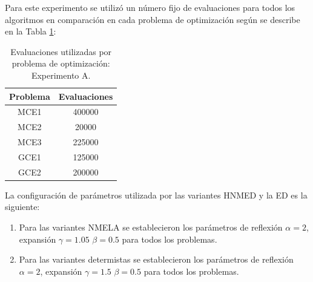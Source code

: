 Para este experimento se utilizó un número fijo de evaluaciones para todos los algoritmos en comparación en cada problema de optimización según se describe en la Tabla \ref{tab:Evaluaciones utilizadas por problema de optimización: Experimento A.}:
 
 \begin{table}[]
 	\centering
 	\caption{Evaluaciones utilizadas por problema de optimización: Experimento A.}
 	\label{tab:Evaluaciones utilizadas por problema de optimización: Experimento A.}
 	\begin{tabular}{cc}
 		\textbf{Problema} &   \textbf{Evaluaciones}     \\
 		\hline
 		MCE1   &   400000       \\
 		MCE2   &   20000       \\
 		MCE3   &   225000      \\
 		GCE1   &   125000       \\
 		GCE2   &   200000      \\
 	\end{tabular}
 \end{table}
 La configuración de parámetros utilizada por las variantes HNMED y la ED es la siguiente:
 \begin{enumerate}
 	\item Para las variantes NMELA se establecieron los parámetros de reflexión $\alpha=2$, expansión $\gamma=1.05$ $\beta=0.5$ para todos los problemas.
 	 	\item Para las variantes determistas se establecieron los parámetros de reflexión $\alpha=2$, expansión $\gamma=1.5$ $\beta=0.5$ para todos los problemas.
 \end{enumerate}
 
